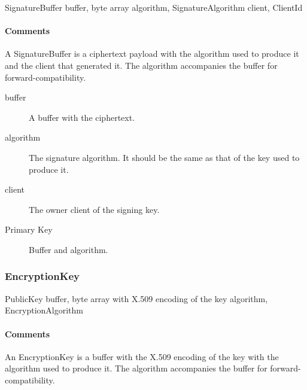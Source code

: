 \documentclass[a4paper,10pt]{article}
\begin{document}
\begin{verbbox}
SignatureBuffer
{
  buffer, byte array
  algorithm, SignatureAlgorithm
  client, ClientId
}
\end{verbbox}
\begin{center}
\theverbbox
\end{center}

\begin{inparaitem}[ ]
 \item \infrastructure
\end{inparaitem}

\paragraph*{Comments}
A SignatureBuffer is a ciphertext payload with the algorithm used to produce it and the client that generated it. The algorithm accompanies the buffer for forward-compatibility.

\SpecialItem
\begin{description}
 \item[buffer] A buffer with the ciphertext.
 \item[algorithm] The signature algorithm. It should be the same as that of the key used to produce it.
 \item[client] The owner client of the signing key.
\end{description}

\begin{description}
 \item[Primary Key] Buffer and algorithm.
\end{description}

\subsubsection{EncryptionKey}

\begin{verbbox}
PublicKey
{
  buffer, byte array with X.509 encoding of the key
  algorithm, EncryptionAlgorithm
}
\end{verbbox}
\begin{center}
\theverbbox
\end{center}

\begin{inparaitem}[ ]
 \item \infrastructure
\end{inparaitem}

\paragraph*{Comments}
An EncryptionKey is a buffer with the X.509 encoding of the key with the algorithm used to produce it. The algorithm accompanies the buffer for forward-compatibility.
\end{document}
